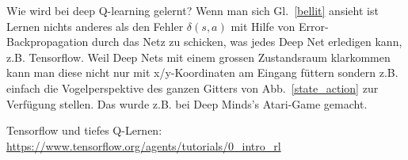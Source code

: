 \documentclass[12pt]{article}
\begin{document}
Wie wird bei deep Q-learning gelernt? Wenn man sich
Gl.~\ref{bellit} ansieht ist Lernen nichts anderes als den
Fehler $\delta(s,a)$ mit Hilfe von Error-Backpropagation durch das
Netz zu schicken, was jedes Deep Net erledigen kann,
z.B. Tensorflow. Weil Deep Nets mit einem grossen Zustandsraum
klarkommen kann man diese nicht nur mit x/y-Koordinaten am Eingang
füttern sondern z.B. einfach die Vogelperspektive des ganzen Gitters
von Abb.~\ref{state_action} zur Verfügung stellen. Das wurde z.B. bei
Deep Minds's Atari-Game gemacht.

Tensorflow und tiefes Q-Lernen:
\url{https://www.tensorflow.org/agents/tutorials/0_intro_rl}
\end{document}
